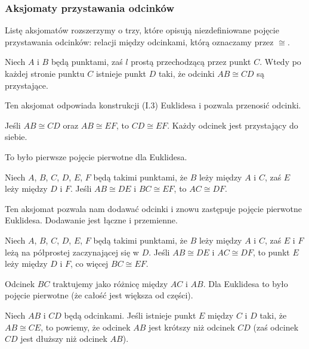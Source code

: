 \subsubsection{Aksjomaty przystawania odcinków}
Listę aksjomatów rozszerzymy o trzy, które opisują niezdefiniowane pojęcie przystawania odcinków: relacji między odcinkami, którą oznaczamy przez $\cong$.

\begin{axiom}[przystawania, C1]
    Niech $A$ i $B$ będą punktami, zaś $l$ prostą przechodzącą przez punkt $C$.
    Wtedy po każdej stronie punktu $C$ istnieje punkt $D$ taki, że odcinki $AB \cong CD$ są przystające.
\end{axiom}

Ten aksjomat odpowiada konstrukcji (I.3) Euklidesa i pozwala przenosić odcinki.

\begin{axiom}[przystawania, C2]
    Jeśli $AB \cong CD$ oraz $AB \cong EF$, to $CD \cong EF$.
    Każdy odcinek jest przystający do siebie.
\end{axiom}

To było pierwsze pojęcie pierwotne dla Euklidesa.

\begin{axiom}[przystawania, C3]
    Niech $A$, $B$, $C$, $D$, $E$, $F$ będą takimi punktami, że $B$ leży między $A$ i $C$, zaś $E$ leży między $D$ i $F$.
    Jeśli $AB \cong DE$ i $BC \cong EF$, to $AC \cong DF$.
\end{axiom}

Ten aksjomat pozwala nam dodawać odcinki i znowu zastępuje pojęcie pierwotne Euklidesa.
Dodawanie jest łączne i przemienne.

\begin{proposition}
    Niech $A$, $B$, $C$, $D$, $E$, $F$ będą takimi punktami, że $B$ leży między $A$ i $C$, zaś $E$ i $F$ leżą na półprostej zaczynającej się w $D$.
    Jeśli $AB \cong DE$ i $AC \cong DF$, to punkt $E$ leży między $D$ i $F$, co więcej $BC \cong EF$.
\end{proposition}

Odcinek $BC$ traktujemy jako różnicę między $AC$ i $AB$.
Dla Euklidesa to było pojęcie pierwotne (że całość jest większa od części).

\begin{definition}
    Niech $AB$ i $CD$ będą odcinkami.
    Jeśli istnieje punkt $E$ między $C$ i $D$ taki, że $AB \cong CE$, to powiemy, że odcinek $AB$ jest krótszy niż odcinek $CD$ (zaś odcinek $CD$ jest dłuższy niż odcinek $AB$).
\end{definition} %

